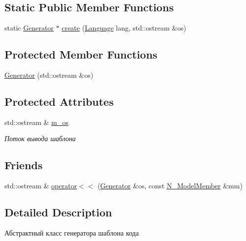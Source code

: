 \subsection*{Static Public Member Functions}
\begin{DoxyCompactItemize}
\item 
static \hyperlink{classGenerator}{Generator} $\ast$ \hyperlink{classGenerator_a8a97794e699a220d5833589d966eb28b}{create} (\hyperlink{ast_8h_a315ca917ad583797f709ea477dd28705}{Language} lang, std\+::ostream \&os)
\end{DoxyCompactItemize}
\subsection*{Protected Member Functions}
\begin{DoxyCompactItemize}
\item 
\hyperlink{classGenerator_a28efb1004a6a78f811a4d7b74f568169}{Generator} (std\+::ostream \&os)
\end{DoxyCompactItemize}
\subsection*{Protected Attributes}
\begin{DoxyCompactItemize}
\item 
std\+::ostream \& \hyperlink{classGenerator_a66fe842aa93b878a74c96fb0852d4626}{m\+\_\+os}
\begin{DoxyCompactList}\small\item\em Поток вывода шаблона \end{DoxyCompactList}\end{DoxyCompactItemize}
\subsection*{Friends}
\begin{DoxyCompactItemize}
\item 
std\+::ostream \& \hyperlink{classGenerator_a5b6ac73277bce0e06ed614d1202031e1}{operator$<$$<$} (\hyperlink{classGenerator}{Generator} \&os, const \hyperlink{classN__ModelMember}{N\+\_\+\+Model\+Member} \&mm)
\end{DoxyCompactItemize}


\subsection{Detailed Description}
Абстрактный класс генератора шаблона кода 

